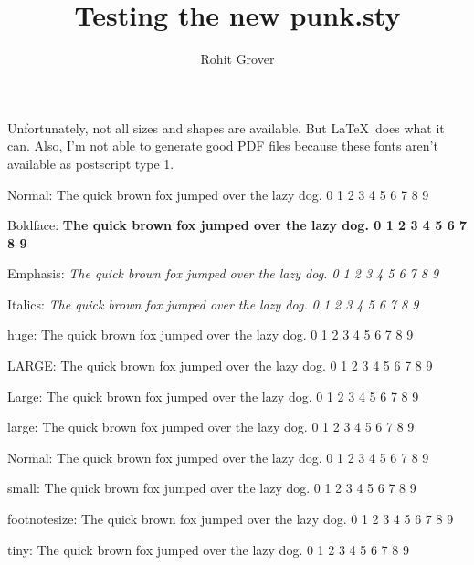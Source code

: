\documentclass[12pt]{article}
\title{Testing the new punk.sty}
\author{Rohit Grover}
\begin{document}
\maketitle
Unfortunately, not all sizes and shapes are available. But
\LaTeX\ does what it can. Also, I'm not able to generate good PDF
files because these fonts aren't available as postscript type 1.


Normal: The quick brown fox jumped over the lazy dog. 0 1 2 3 4 5 6 7 8 9


Boldface: {\bf The quick brown fox jumped over the lazy dog. 0 1 2 3 4 5 6 7 8 9
}


Emphasis: {\em The quick brown fox jumped over the lazy dog. 0 1 2 3 4 5 6 7 8 9
}


Italics: {\it The quick brown fox jumped over the lazy dog. 0 1 2 3 4 5 6 7 8 9
}

huge: {\huge The quick brown fox jumped over the lazy dog. 0 1 2 3 4 5 6 7 8 9
}

LARGE: {\LARGE The quick brown fox jumped over the lazy dog. 0 1 2 3 4 5 6 7 8 9
}

Large: {\Large The quick brown fox jumped over the lazy dog. 0 1 2 3 4 5 6 7 8 9
}

large: {\large The quick brown fox jumped over the lazy dog. 0 1 2 3 4 5 6 7 8 9
}

Normal: The quick brown fox jumped over the lazy dog. 0 1 2 3 4 5 6 7 8 9


small: {\small The quick brown fox jumped over the lazy dog. 0 1 2 3 4 5 6 7 8 9
}

footnotesize: {\footnotesize The quick brown fox jumped over the lazy
dog. 0 1 2 3 4 5 6 7 8 9
}

tiny: {\tiny The quick brown fox jumped over the lazy dog. 0 1 2 3 4 5 6 7 8 9
}
\end{document}
